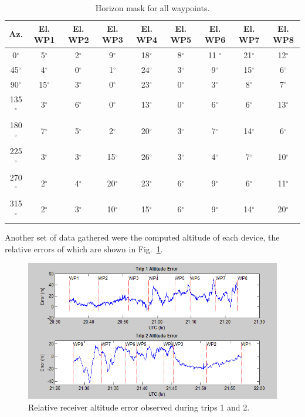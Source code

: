\documentclass[]{aiaa-tc}%
\begin{document}
	\begin{table}[H]%
		\begin{center}
			\caption{Horizon mask for all waypoints.}
			\label{t:WaypointsHorMask}
			\begin{tabular}{c|c|c|c|c|c|c|c|c}
				Az. & El. WP1 & El. WP2 & El. WP3& El. WP4 & El. WP5 & El. WP6 & El. WP7 & El. WP8\\ \hline
				0$^{\circ}$  & 5$^{\circ}$ & 2$^{\circ}$ & 9$^{\circ}$ & 18$^{\circ}$ & 8$^{\circ}$& 11 $^{\circ}$& 21$^{\circ}$& 12$^{\circ}$ \\
				45$^{\circ}$ & 4$^{\circ}$ & 0$^{\circ}$ & 1$^{\circ}$ & 24$^{\circ}$ & 3$^{\circ}$& 9$^{\circ}$& 15$^{\circ}$& 6$^{\circ}$ \\
				90$^{\circ}$ & 15$^{\circ}$ & 3$^{\circ}$ & 0$^{\circ}$ & 23$^{\circ}$ & 0$^{\circ}$& 3$^{\circ}$& 8$^{\circ}$& 7$^{\circ}$ \\
				135$^{\circ}$ & 3$^{\circ}$ & 6$^{\circ}$ & 0$^{\circ}$ & 13$^{\circ}$ & 0$^{\circ}$& 6$^{\circ}$& 6$^{\circ}$& 13$^{\circ}$ \\
				180$^{\circ}$ & 7$^{\circ}$ & 5$^{\circ}$ & 2$^{\circ}$ &  20$^{\circ}$ & 3$^{\circ}$& 7$^{\circ}$& 14$^{\circ}$& 6$^{\circ}$ \\
				225$^{\circ}$ & 3$^{\circ}$ & 3$^{\circ}$ & 15$^{\circ}$ & 26$^{\circ}$ & 3$^{\circ}$& 4$^{\circ}$& 7$^{\circ}$& 10$^{\circ}$ \\
				270$^{\circ}$ & 2$^{\circ}$ & 4$^{\circ}$ & 20$^{\circ}$ & 23$^{\circ}$ & 6$^{\circ}$& 9$^{\circ}$& 6$^{\circ}$& 11$^{\circ}$ \\
				315$^{\circ}$ & 2$^{\circ}$ & 3$^{\circ}$ & 10$^{\circ}$ & 15$^{\circ}$ & 6$^{\circ}$& 9$^{\circ}$& 14$^{\circ}$& 20$^{\circ}$ \\
				
			\end{tabular}
		\end{center}
	\end{table}  
	
	\noindent Another set of data gathered were the computed altitude of each device, the relative errors of which are shown in Fig.~\ref{fig:AltitudeErr}.
	
	\begin{figure}[H]
		\centering
		\includegraphics[width = 13cm]{AltitudeErr.PNG}
		\caption{Relative receiver altitude error observed during trips 1 and 2.}
		\label{fig:AltitudeErr}
	\end{figure}
	
\end{document}
